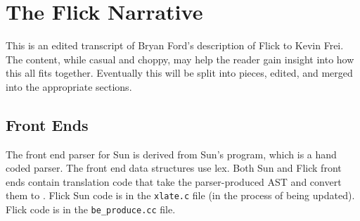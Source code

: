 

\chapter{The Flick Narrative}
\label{cha:The Flick Narrative}

This is an edited transcript of Bryan Ford's description of Flick to Kevin
Frei.  The content, while casual and choppy, may help the reader gain insight
into how this all fits together.  Eventually this will be split into pieces,
edited, and merged into the appropriate sections.


\section{Front Ends}

The front end parser for Sun \ONCRPC{} is derived from Sun's \rpcgen{} program,
which is a hand coded parser.  The \CORBA{} \IDL{} front end data structures use lex.
Both Sun and \CORBA{} Flick front ends contain translation code that take the
parser-produced AST and convert them to \AOI{}\@.  Flick Sun code is in the
\texttt{xlate.c} file (in the process of being updated).  Flick \CORBA{} code is
in the \texttt{be\_produce.cc} file.



